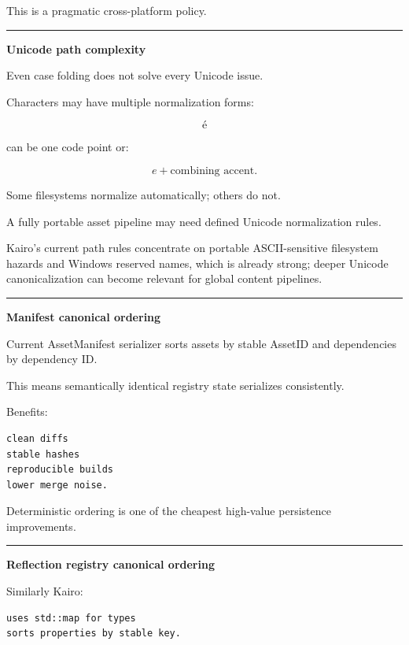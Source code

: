 This is a pragmatic cross-platform policy.

\begin{center}\rule{0.5\linewidth}{0.5pt}\end{center}

\textbf{Unicode path complexity}

Even case folding does not solve every Unicode issue.

Characters may have multiple normalization forms:

\[\text{é}\]

can be one code point or:

\[
e+\text{combining accent}.
\]

Some filesystems normalize automatically; others do not.

A fully portable asset pipeline may need defined Unicode normalization rules.

Kairo's current path rules concentrate on portable ASCII-sensitive filesystem hazards and Windows reserved names, which is already strong; deeper Unicode canonicalization can become relevant for global content pipelines.

\begin{center}\rule{0.5\linewidth}{0.5pt}\end{center}

\textbf{Manifest canonical ordering}

Current AssetManifest serializer sorts assets by stable AssetID and dependencies by dependency ID.

This means semantically identical registry state serializes consistently.

Benefits:

\begin{verbatim}
clean diffs
stable hashes
reproducible builds
lower merge noise.
\end{verbatim}

Deterministic ordering is one of the cheapest high-value persistence improvements.

\begin{center}\rule{0.5\linewidth}{0.5pt}\end{center}

\textbf{Reflection registry canonical ordering}

Similarly Kairo:

\begin{verbatim}
uses std::map for types
sorts properties by stable key.
\end{verbatim}

